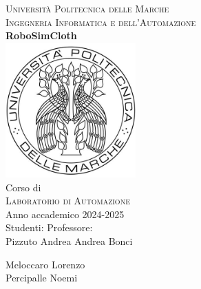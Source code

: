 \documentclass[11pt]{report}
\begin{document}


\begin{titlepage}
\begin{center}
\LARGE {\scshape{Università Politecnica delle Marche}}\\[0.5cm]
\LARGE {\scshape{Ingegneria Informatica e dell'Automazione}}\\[0.7cm]
\linespread{1}
\huge {\bfseries RoboSimCloth}\\[1cm]
\linespread{1}
\includegraphics[width=5cm]{images/logoUnivpm.jpg}\\[0.5cm]
\linespread{1.2}
\Large Corso di\\
\Large {\scshape{Laboratorio di Automazione}} \\[0.3cm]
\Large {Anno accademico 2024-2025 \\[0.8cm]}
{\Large Studenti:}
\hfill {\Large Professore:}\\
{\Large Pizzuto Andrea}
\hfill
{\Large Andrea Bonci}

\raggedright{\Large Meloccaro Lorenzo\\
\Large Percipalle Noemi\\} 



\end{center}
\end{titlepage}
\end{document}

